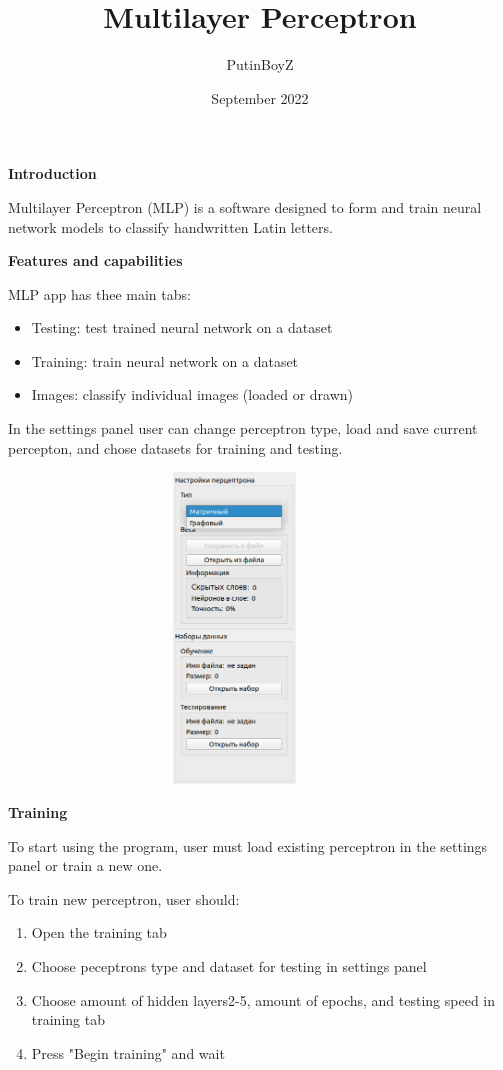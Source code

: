 \documentclass[12pt, letterpaper
]{article}
\title{Multilayer Perceptron}
\author{PutinBoyZ}
\date{September 2022}
\begin{document}
\begin{titlepage}
  \maketitle
\end{titlepage}  

\textbf{Introduction}

Multilayer Perceptron (MLP) is a software designed to form and train neural network models to classify handwritten Latin letters. 

\textbf{Features and capabilities}

MLP app has thee main tabs:

\begin{itemize}
\item
  Testing: test trained neural network on a dataset
\item
  Training: train neural network on a dataset
\item
  Images: classify individual images (loaded or drawn)
\end{itemize}

In the settings panel user can change perceptron type, load and save current percepton, and chose datasets for training and testing.

\includegraphics[width=4.72361in,height=3.25208in]{images/settings.png}

\textbf{Training}

To start using the program, user must load existing perceptron in the settings panel or train a new one.

To train new perceptron, user should:

\begin{enumerate}
    \item Open the training tab
    \item Choose peceptrons type and dataset for testing in settings panel
    \item Choose amount of hidden layers2-5, amount of epochs, and testing speed in training tab
    \item Press "Begin training" and wait
\end{enumerate}
\end{document}
